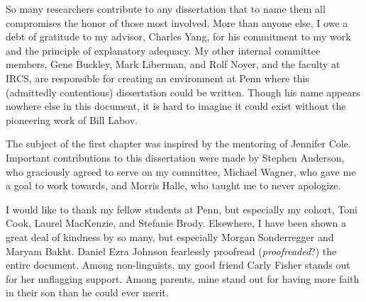 So many researchers contribute to any dissertation that to name them all compromises the honor of those most involved. More than anyone else, I owe a debt of gratitude to my advisor, Charles Yang, for his commitment to my work and the principle of explanatory adequacy. My other internal committee members, Gene Buckley, Mark Liberman, and Rolf Noyer, and the faculty at IRCS, are responsible for creating an environment at Penn where this (admittedly contentious) dissertation could be written. Though his name appears nowhere else in this document, it is hard to imagine it could exist without the pioneering work of Bill Labov.

The subject of the first chapter was inspired by the mentoring of Jennifer Cole. Important contributions to this dissertation were made by Stephen Anderson, who graciously agreed to serve on my committee, Michael Wagner, who gave me a goal to work towards, and Morris Halle, who taught me to never apologize.

I would like to thank my fellow students at Penn, but especially my cohort, Toni Cook, Laurel MacKenzie, and Stefanie Brody. Elsewhere, I have been shown a great deal of kindness by so many, but especially Morgan Sonderregger and Maryam Bakht. Daniel Ezra Johnson fearlessly proofread (\emph{proofreaded}?) the entire document. Among non-linguists, my good friend Carly Fisher stands out for her unflagging support. Among parents, mine stand out for having more faith in their son than he could ever merit. 
